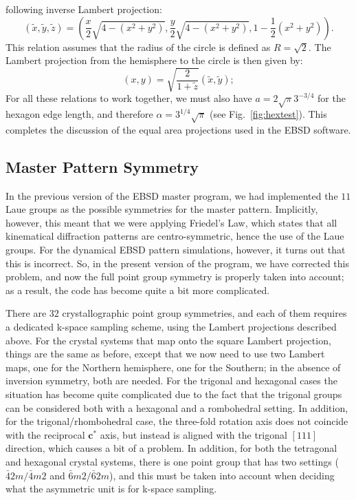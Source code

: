\documentclass[DIV=calc, paper=letter, fontsize=11pt]{scrartcl}	 %
\begin{document}
following inverse Lambert projection:
\begin{equation}
 (\widetilde{x},\widetilde{y},\widetilde{z}) =
\left(\frac{x}{2}\sqrt{4-(x^2+y^2)} ,\frac{y}{2}\sqrt{4-(x^2+y^2)}, 1-\frac{1}{2}(x^2+y^2)\right).\label{eq:lama}
\end{equation}
This relation assumes that the radius of the circle is defined as $R=\sqrt{2}$.
The Lambert projection from the hemisphere to the circle is then given by:
\begin{equation}
    (x,y) = \sqrt{\frac{2}{1+\widetilde{z}}} \left(\widetilde{x},\widetilde{y} \right);\label{eq:lamb}
\end{equation}
For all these relations to work together, we must also have $a=2\sqrt \pi 3^{-3/4}$ for the hexagon edge
length, and therefore $\alpha=3^{1/4}\sqrt{\pi}$ (see Fig.~\ref{fig:hextest}).  This completes the discussion 
of the equal area projections used in the EBSD software.

\subsection{Master Pattern Symmetry \label{sec:Laue}}
In the previous version of the EBSD master program, we had implemented the $11$ Laue groups as the possible 
symmetries for the master pattern.  Implicitly, however, this meant that we were applying Friedel's Law, which 
states that all kinematical diffraction patterns are centro-symmetric, hence the use of the Laue groups. For the 
dynamical EBSD pattern simulations, however, it turns out that this is incorrect.  So, in the present version of the 
program, we have corrected this problem, and now the full point group symmetry is properly taken into account;
as a result, the code has become quite a bit more complicated.

There are $32$ crystallographic point group symmetries, and each of them requires a dedicated k-space sampling scheme, using the Lambert projections described above.
For the crystal systems that map onto the square Lambert projection, things are the same as before, except that we now need to use 
two Lambert maps, one for the Northern hemisphere, one for the Southern; in the absence of inversion symmetry, both are needed.
For the trigonal and hexagonal cases the situation has become quite complicated due to the fact that the trigonal groups can be
considered both with a hexagonal and a rombohedral setting.  In addition, for the trigonal/rhombohedral case, the three-fold 
rotation axis does not coincide with the reciprocal $\mathbf{c}^{\ast}$ axis, but instead is aligned with the trigonal $[111]$ direction, 
which causes a bit of a problem.  In addition, for both the tetragonal and hexagonal crystal systems, there is one point group
that has two settings ($\bar{4}2m/\bar{4}m2$ and $\bar{6}m2/\bar{6}2m$), and this must be taken into account when deciding 
what the asymmetric unit is for k-space sampling.
\end{document}
